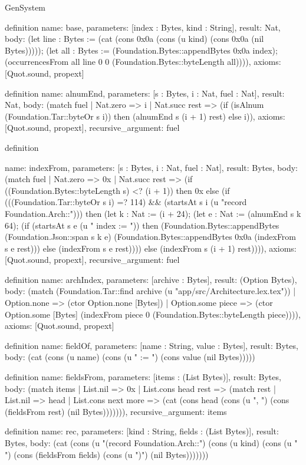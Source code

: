 \begin{lexlean}{GenSystem}
\begin{semanticmodule}
definition{
  name: base,
  parameters: [index : Bytes, kind : String],
  result: Nat,
  body: (let line : Bytes := (cat (cons 0x0a (cons (u kind) (cons 0x0a (nil Bytes))))); (let all : Bytes := (Foundation.Bytes::appendBytes 0x0a index); (occurrencesFrom all line 0 0 (Foundation.Bytes::byteLength all)))),
  axioms: [Quot.sound, propext]
}

definition{
  name: alnumEnd,
  parameters: [s : Bytes, i : Nat, fuel : Nat],
  result: Nat,
  body: (match fuel
    | Nat.zero => i
    | Nat.succ rest => (if (isAlnum (Foundation.Tar::byteOr s i)) then (alnumEnd s (i + 1) rest) else i)),
  axioms: [Quot.sound, propext],
  recursive_argument: fuel
}

definition{
  name: indexFrom,
  parameters: [s : Bytes, i : Nat, fuel : Nat],
  result: Bytes,
  body: (match fuel
    | Nat.zero => 0x
    | Nat.succ rest => (if ((Foundation.Bytes::byteLength s) <? (i + 1)) then 0x else (if (((Foundation.Tar::byteOr s i) =? 114) && (startsAt s i (u "record Foundation.Arch::"))) then (let k : Nat := (i + 24); (let e : Nat := (alnumEnd s k 64); (if (startsAt s e (u " {index := ")) then (Foundation.Bytes::appendBytes (Foundation.Json::span s k e) (Foundation.Bytes::appendBytes 0x0a (indexFrom s e rest))) else (indexFrom s e rest)))) else (indexFrom s (i + 1) rest)))),
  axioms: [Quot.sound, propext],
  recursive_argument: fuel
}

definition{
  name: archIndex,
  parameters: [archive : Bytes],
  result: (Option Bytes),
  body: (match (Foundation.Tar::find archive (u "app/src/Architecture.lex.tex"))
    | Option.none => (ctor Option.none [Bytes])
    | Option.some piece => (ctor Option.some [Bytes] (indexFrom piece 0 (Foundation.Bytes::byteLength piece)))),
  axioms: [Quot.sound, propext]
}

definition{
  name: fieldOf,
  parameters: [name : String, value : Bytes],
  result: Bytes,
  body: (cat (cons (u name) (cons (u " := ") (cons value (nil Bytes)))))
}

definition{
  name: fieldsFrom,
  parameters: [items : (List Bytes)],
  result: Bytes,
  body: (match items
    | List.nil => 0x
    | List.cons head rest => (match rest
      | List.nil => head
      | List.cons next more => (cat (cons head (cons (u ", ") (cons (fieldsFrom rest) (nil Bytes))))))),
  recursive_argument: items
}

definition{
  name: rec,
  parameters: [kind : String, fields : (List Bytes)],
  result: Bytes,
  body: (cat (cons (u "(record Foundation.Arch::") (cons (u kind) (cons (u " {") (cons (fieldsFrom fields) (cons (u "})") (nil Bytes)))))))
}

}
\end{semanticmodule}
\end{lexlean}
